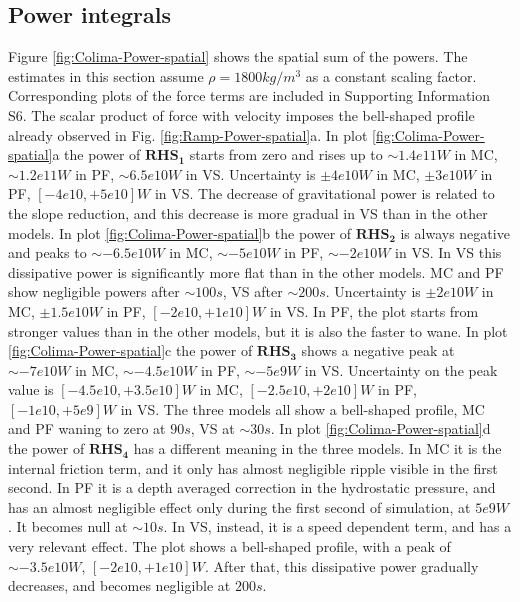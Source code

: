 \documentclass{article}
\begin{document}
\subsection{Power integrals}
Figure \ref{fig:Colima-Power-spatial} shows the spatial sum of the powers. The estimates in this section assume $\rho = 1800 kg/m^3$ as a constant scaling factor. Corresponding plots of the force terms are included in Supporting Information S6. The scalar product of force with velocity imposes the bell-shaped profile already observed in Fig. \ref{fig:Ramp-Power-spatial}a. In plot \ref{fig:Colima-Power-spatial}a the power of $\boldsymbol{RHS_1}$ starts from zero and rises up to $\sim 1.4e11 W$ in MC, $\sim 1.2e11 W$ in PF, $\sim 6.5e10 W$ in VS. Uncertainty is $\pm 4e10 W$ in MC, $\pm 3e10 W$ in PF, $[-4e10,+5e10] W$ in VS. The decrease of gravitational power is related to the slope reduction, and this decrease is more gradual in VS than in the other models. In plot \ref{fig:Colima-Power-spatial}b the power of  $\boldsymbol{RHS_2}$ is always negative and peaks to $\sim -6.5e10 W$ in MC, $\sim -5e10 W$ in PF, $\sim -2e10 W$ in VS. In VS this dissipative power is significantly more flat than in the other models. MC and PF show negligible powers after $\sim 100 s$, VS after $\sim 200 s$. Uncertainty is $\pm 2e10 W$ in MC, $\pm 1.5e10 W$ in PF, $[-2e10,+1e10] W$ in VS. In PF, the plot starts from stronger values than in the other models, but it is also the faster to wane. In plot \ref{fig:Colima-Power-spatial}c the power of $\boldsymbol{RHS_3}$ shows a negative peak at $\sim -7e10 W$ in MC, $\sim -4.5e10 W$ in PF, $\sim -5e9 W$ in VS. Uncertainty on the peak value is $[-4.5e10,+3.5e10] W$ in MC, $[-2.5e10,+2e10] W$ in PF, $[-1e10,+5e9] W$ in VS. The three models all show a bell-shaped profile, MC and PF waning to zero at $90 s$, VS at $\sim 30 s$. In plot \ref{fig:Colima-Power-spatial}d the power of $\boldsymbol{RHS_4}$ has a different meaning in the three models. In MC it is the internal friction term, and it only has almost negligible ripple visible in the first second. In PF it is a depth averaged correction in the hydrostatic pressure, and has an almost negligible effect only during the first second of simulation, at $5e9 W$. It becomes null at $\sim 10 s$. In VS, instead, it is a speed dependent term, and has a very relevant effect. The plot shows a bell-shaped profile, with a peak of $\sim -3.5e10 W$, $[-2e10,+1e10] W$. After that, this dissipative power gradually decreases, and becomes negligible at $200 s$.
\end{document}
